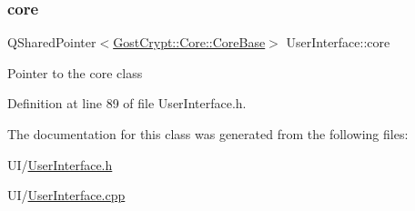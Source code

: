 \subsubsection{\texorpdfstring{core}{core}}
{\footnotesize\ttfamily Q\+Shared\+Pointer$<$\hyperlink{class_gost_crypt_1_1_core_1_1_core_base}{Gost\+Crypt\+::\+Core\+::\+Core\+Base}$>$ User\+Interface\+::core\hspace{0.3cm}{\ttfamily [protected]}}

Pointer to the core class 

Definition at line 89 of file User\+Interface.\+h.



The documentation for this class was generated from the following files\+:\begin{DoxyCompactItemize}
\item 
U\+I/\hyperlink{_user_interface_8h}{User\+Interface.\+h}\item 
U\+I/\hyperlink{_user_interface_8cpp}{User\+Interface.\+cpp}\end{DoxyCompactItemize}
